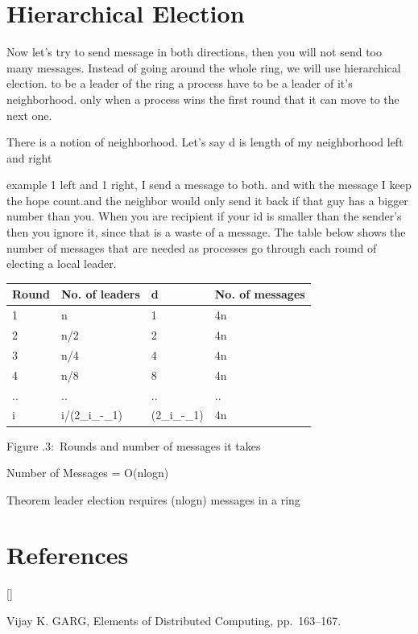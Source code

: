 \documentclass[twoside]{article}
\newcounter{lecnum}
\def\beginrefs{\begin{list}%
        {[\arabic{equation}]}{\usecounter{equation}
         \setlength{\leftmargin}{2.0truecm}\setlength{\labelsep}{0.4truecm}%
         \setlength{\labelwidth}{1.6truecm}}}
\def\endrefs{\end{list}}
\def\bibentry#1{\item[\hbox{[#1]}]}
\newcommand{\fig}[3]{
			\vspace{#2}
			\begin{center}
			Figure \thelecnum.#1:~#3
			\end{center}
	}
\begin{document}
\section{Hierarchical Election}
Now let's try to send message in both directions, then you will not send too many messages. Instead of going around the whole ring, we will use hierarchical election. to be a leader of the ring a process have to be a leader of it's neighborhood. only when a process wins the first round that it can move to the next one.

There is a notion of neighborhood. Let's say d is length of my neighborhood left and right

example 1 left and 1 right, I send a message to both. and with the message I keep the hope count.and the neighbor would only send it back if that guy has a bigger number than you. When you are recipient if your id is smaller than the sender's then you ignore it, since that is a waste of a message. The table below shows the number of messages that are needed as processes go through each round of electing a local leader.

\begin{center}
    \begin{tabular}{| l | l | l | l |}
    \hline
    Round & No. of leaders & d  & No. of messages\\ \hline
    1 & n & 1 & 4n \\ \hline
    2 & n/2 & 2 & 4n \\ \hline
    3 & n/4 & 4 & 4n \\ \hline
    4 & n/8 & 8 & 4n \\ \hline
    .. & .. & .. & .. \\ \hline
    i & i/(2_i_-_1) & (2_i_-_1) & 4n \\ \hline
  
    \hline
    \end{tabular}
    \fig{3}{0in}{Rounds and number of messages it takes}
\end{center}



Number of Messages = O(nlogn)

Theorem
leader election requires \Omega(nlogn)  messages in a ring


\section*{References}
\beginrefs
\bibentry{GARG02}{\sc Vijay K. GARG},
Elements of Distributed Computing,
pp.~163--167.

\endrefs
\end{document}
